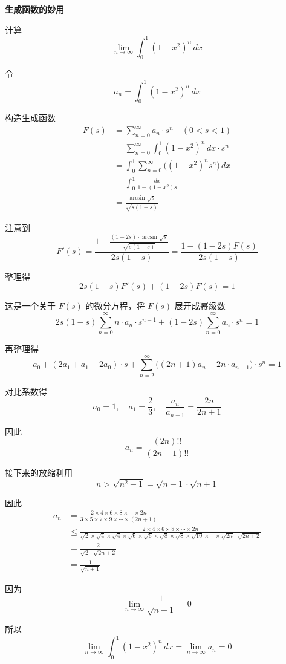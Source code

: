 \documentclass[11pt]{article}%
\newcommand{\articlename}{生成函数的妙用}
\newenvironment{solution}{{\noindent\hskip 2em \bf 解 \quad}}{\par}
\begin{document}
    \begin{center}
        \LARGE \bf \articlename
    \end{center}

计算
\[
\lim_{n \to \infty} \int_0^1 (1 - x^2)^n \, dx
\]

\begin{solution}
令 
\[
a_n = \int_0^1 (1 - x^2)^n \, dx
\]

构造生成函数
\[
\begin{aligned}
F(s) &= \sum_{n=0}^\infty a_n \cdot s^n \quad (0 < s < 1) \\
&= \sum_{n=0}^\infty \int_0^1 (1 - x^2)^n \, dx \cdot s^n \\
&= \int_0^1 \sum_{n=0}^\infty \bigl((1 - x^2)^n s^n\bigr) \, dx \\
&= \int_0^1 \frac{dx}{1 - (1 - x^2) s} \\
&= \frac{\arcsin \sqrt{s}}{\sqrt{s(1 - s)}}
\end{aligned}
\]

注意到
\[
F'(s) = \frac{1 - \frac{(1 - 2s) \cdot \arcsin \sqrt{s}}{\sqrt{s(1 - s)}}}{2s(1 - s)} = \frac{1 - (1 - 2s) F(s)}{2s(1 - s)}
\]

整理得
\[
2s(1 - s) F'(s) + (1 - 2s) F(s) = 1
\]

这是一个关于 \( F(s) \) 的微分方程，将 \( F(s) \) 展开成幂级数
\[
2s(1 - s) \sum_{n=0}^\infty n \cdot a_n \cdot s^{n-1} + (1 - 2s) \sum_{n=0}^\infty a_n \cdot s^n = 1
\]

再整理得
\[
a_0 + (2a_1 + a_1 - 2a_0) \cdot s + \sum_{n=2}^\infty \bigl((2n+1)a_n - 2n \cdot a_{n-1}\bigr) \cdot s^n = 1
\]

对比系数得
\[
a_0 = 1,\quad a_1 = \frac{2}{3},\quad \frac{a_n}{a_{n-1}} = \frac{2n}{2n+1}
\]

因此
\[
a_n = \frac{(2n)!!}{(2n+1)!!}
\]

接下来的放缩利用
\[ 
n > \sqrt{n^2 - 1} = \sqrt{n - 1} \cdot \sqrt{n + 1} 
\]

因此
\[
\begin{aligned}
a_n &= \frac{2 \times 4 \times 6 \times 8 \times \cdots \times 2n}{3 \times 5 \times 7 \times 9 \times \cdots \times (2n+1)} \\
&\le \frac{2 \times 4 \times 6 \times 8 \times \cdots \times 2n}{\sqrt{2} \times \sqrt{4} \times \sqrt{4} \times \sqrt{6} \times \sqrt{6} \times \sqrt{8} \times \sqrt{8} \times \sqrt{10} \times \cdots \times \sqrt{2n} \cdot \sqrt{2n+2}} \\
&= \frac{2}{\sqrt{2} \cdot \sqrt{2n+2}} \\
&= \frac{1}{\sqrt{n+1}}
\end{aligned}
\]

因为
\[
\lim_{n \to \infty} \frac{1}{\sqrt{n+1}} = 0
\]

所以
\[
\lim_{n \to \infty} \int_0^1 (1-x^2)^n \, dx = \lim_{n \to \infty} a_n = 0
\]
\end{solution}
\end{document}
